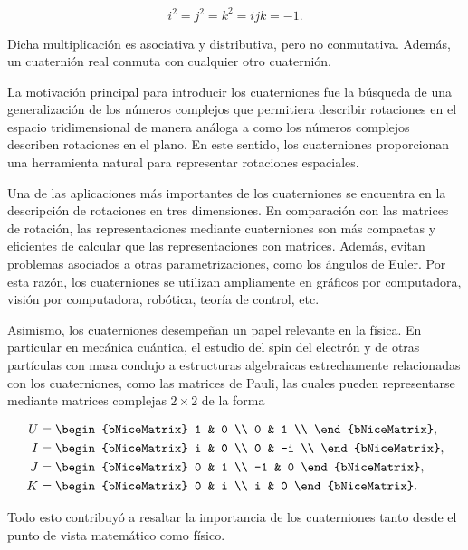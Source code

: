 \documentclass{fc-hw-template}
\begin{document}
\begin{equation*}
	i^{2} = j^{2} = k^{2} = ijk = -1.
\end{equation*}

Dicha multiplicación es asociativa y distributiva, pero no conmutativa. Además, un
cuaternión real conmuta con cualquier otro cuaternión.

La motivación principal para introducir los cuaterniones fue la búsqueda de una
generalización de los números complejos que permitiera describir rotaciones en el
espacio tridimensional de manera análoga a como los números complejos describen
rotaciones en el plano. En este sentido, los cuaterniones proporcionan una herramienta
natural para representar rotaciones espaciales.

Una de las aplicaciones más importantes de los cuaterniones se encuentra en la
descripción de rotaciones en tres dimensiones. En comparación con las matrices de rotación,
las representaciones mediante cuaterniones son más compactas y eficientes de calcular que
las representaciones con matrices. Además, evitan problemas asociados a otras
parametrizaciones, como los ángulos de Euler. Por esta razón, los cuaterniones se
utilizan ampliamente en gráficos por computadora, visión por computadora, robótica,
teoría de control, etc.

Asimismo, los cuaterniones desempeñan un papel relevante en la física. En particular en
mecánica cuántica, el estudio del spin del electrón y de otras partículas con masa
condujo a estructuras algebraicas estrechamente relacionadas con los cuaterniones, como
las matrices de Pauli, las cuales pueden representarse mediante matrices complejas \(2
\times 2\) de la forma

\begin{align*}
	U & = \begin{bNiceMatrix}
		      1 & 0 \\
		      0 & 1 \\
	      \end{bNiceMatrix}, \\
	I & = \begin{bNiceMatrix}
		      i & 0  \\
		      0 & -i \\
	      \end{bNiceMatrix}, \\
	J & = \begin{bNiceMatrix}
		      0  & 1 \\
		      -1 & 0
	      \end{bNiceMatrix}, \\
	K & = \begin{bNiceMatrix}
		      0 & i \\
		      i & 0
	      \end{bNiceMatrix}.
\end{align*}

Todo esto contribuyó a resaltar la importancia de los cuaterniones tanto desde el punto
de vista matemático como físico.
\end{document}
